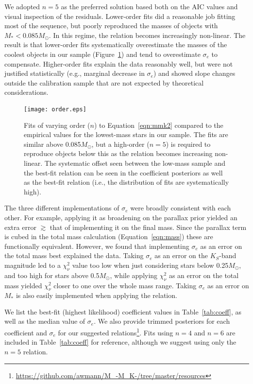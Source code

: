 \documentclass[twocolumn]{aastex62}
\newcommand{\order}{5}
\begin{document}
We adopted $n=\order$ as the preferred solution based both on the AIC values and visual inspection of the residuals. Lower-order fits did a reasonable job fitting most of the sequence, but poorly reproduced the masses of objects with $M_*<0.085M_\odot$. In this regime, the relation becomes increasingly non-linear. The result is that lower-order fits systematically overestimate the masses of the coolest objects in our sample (Figure~\ref{fig:order}) and tend to overestimate $\sigma_e$ to compensate. Higher-order fits explain the data reasonably well, but were not justified statistically (e.g., marginal decrease in $\sigma_e$) and showed slope changes outside the calibration sample that are not expected by theoretical considerations. 

\begin{figure}[h]
\begin{center}
\texttt{[image: order.eps]}
\caption{Fits of varying order ($n$) to Equation~\ref{eqn:mmk2} compared to the empirical values for the lowest-mass stars in our sample. The fits are similar above 0.085$M_\odot$, but a high-order ($n=\order$) is required to reproduce objects below this as the relation becomes increasing non-linear. The systematic offset seen between the low-mass sample and the best-fit relation can be seen in the coefficient posteriors as well as the best-fit relation (i.e., the distribution of fits are systematically high). }
\label{fig:order}
\end{center}
\end{figure}

The three different implementations of $\sigma_e$ were broadly consistent with each other. For example, applying it as broadening on the parallax prior yielded an extra error $\gtrsim$ that of implementing it on the final mass. Since the parallax term is cubed in the total mass calculation (Equation~\ref{eqn:mass}) these are functionally equivalent. However, we found that implementing $\sigma_e$ as an error on the total mass best explained the data. Taking $\sigma_e$ as an error on the $K_S$-band magnitude led to a $\chi^2_\nu$ value too low when just considering stars below 0.25$M_\odot$, and too high for stars above 0.5$M_\odot$, while applying $\chi^2_\nu$ as an error on the total mass yielded $\chi^2_\nu$ closer to one over the whole mass range. Taking $\sigma_e$ as an error on $M_*$ is also easily implemented when applying the relation. 

We list the best-fit (highest likelihood) coefficient values in Table~\ref{tab:coeff}, as well as the median value of $\sigma_e$. We also provide trimmed posteriors for each coefficient and $\sigma_e$ for our suggested relations\footnote{\href{https://github.com/awmann/M_-M_K-/tree/master/resources}{https://github.com/awmann/M\_-M\_K-/tree/master/resources}}. Fits using $n=4$ and $n=6$ are included in Table~\ref{tab:coeff} for reference, although we suggest using only the $n=\order$ relation. 
\end{document}
